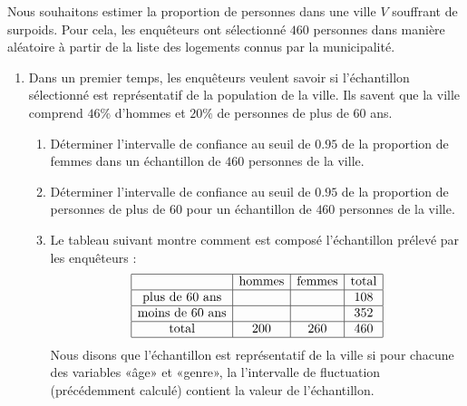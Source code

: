 
\begin{exercice}\label{exosmath-0349}

    Nous souhaitons estimer la proportion de personnes dans une ville \( V\) souffrant de surpoids. Pour cela, les enquêteurs ont sélectionné \( 460\) personnes dans manière aléatoire à partir de la liste des logements connus par la municipalité.
    \begin{enumerate}
        \item
            Dans un premier temps, les enquêteurs veulent savoir si l'échantillon sélectionné est représentatif de la population de la ville. Ils savent que la ville comprend \( 46\%\) d'hommes et \( 20\%\) de personnes de plus de \( 60\) ans.
            \begin{enumerate}
                \item
                    Déterminer l'intervalle de confiance au seuil de \( 0.95\) de la proportion de femmes dans un échantillon de \( 460\) personnes de la ville.
                \item
                    Déterminer l'intervalle de confiance au seuil de \( 0.95\) de la proportion de personnes de plus de \( 60\) pour un échantillon de \( 460\) personnes de la ville.
                \item
                    Le tableau suivant montre comment est composé l'échantillon prélevé par les enquêteurs :
                    \begin{equation*}
                        \begin{array}[]{|c|c|c|c|}
                            \hline
                            &\text{hommes}&\text{femmes}&\text{total}\\
                            \hline
                            \text{plus de \( 60\) ans}&&&108\\
                            \hline
                            \text{moins de \( 60\) ans}&&&352\\
                            \hline
                            \text{total}&200&260&460\\
                            \hline
                        \end{array}
                    \end{equation*}
                    Nous disons que l'échantillon est représentatif de la ville si pour chacune des variables «âge» et «genre», la l'intervalle de fluctuation (précédemment calculé) contient la valeur de l'échantillon.


\end{enumerate}
\end{enumerate}
\end{exercice}
